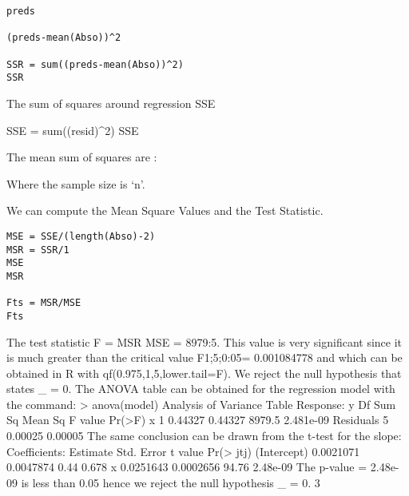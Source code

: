 \begin{framed}
\begin{verbatim}
preds

(preds-mean(Abso))^2

SSR = sum((preds-mean(Abso))^2)
SSR

\end{verbatim}
\end{framed}

The sum of squares around regression SSE

SSE = sum((resid)^2)
SSE



The mean sum of squares are :



Where the sample size is ‘n’.

We can compute the Mean Square Values and the Test Statistic.
\begin{framed}
\begin{verbatim}
MSE = SSE/(length(Abso)-2)
MSR = SSR/1
MSE
MSR

Fts = MSR/MSE
Fts
\end{verbatim}
\end{framed}



The test statistic F = MSR
MSE = 8979:5. This value is very significant since it is much greater than the
critical value F1;5;0:05= 0.001084778 and which can be obtained in R with qf(0.975,1,5,lower.tail=F).
We reject the null hypothesis that states _ = 0.
The ANOVA table can be obtained for the regression model with the command: > anova(model)
Analysis of Variance Table
Response: y
Df Sum Sq Mean Sq F value Pr(>F)
x 1 0.44327 0.44327 8979.5 2.481e-09
Residuals 5 0.00025 0.00005
The same conclusion can be drawn from the t-test for the slope:
Coefficients:
Estimate Std. Error t value Pr(> jtj)
(Intercept) 0.0021071 0.0047874 0.44 0.678
x 0.0251643 0.0002656 94.76 2.48e-09
The p-value = 2.48e-09 is less than 0.05 hence we reject the null hypothesis _ = 0.
3
